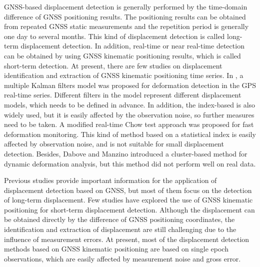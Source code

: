 \documentclass[final,3p,times]{elsarticle}
\begin{document}
	\textcolor{r_s}{
	GNSS-based displacement detection is generally performed by the time-domain difference of GNSS positioning results\cite{abidin2004use,rs12203375}. The positioning results can be obtained from repeated GNSS static measurements and the repetition period is generally one day to several months. This kind of displacement detection is called long-term displacement detection. In addition, real-time or near real-time detection can be obtained by using GNSS kinematic positioning results, which is called short-term detection.}
	At present, there are few studies on displacement identification and extraction of GNSS kinematic positioning time series. In \cite{li2010deformation}, a multiple Kalman filters model was proposed for deformation detection in the GPS real-time series. Different filters in the model represent different displacement models, which \textcolor{r_s}{needs} to be defined in advance. 
	In addition, the index-based is also widely used, but it is easily affected by the observation noise, so further measures need to be taken\cite{shen_shortterm2021}.
	A modified real-time Chow test approach was proposed for fast deformation monitoring\cite{bellone2016real}. This kind of method based on \textcolor{r_s}{a} statistical index is easily affected by observation noise, and is not suitable for small displacement detection\cite{pirotti2015micro}. Besides, Dabove and Manzino\cite{dabove2016fast} introduced a cluster-based method for dynamic deformation analysis, but this method did not perform well on real data.
	
	Previous studies provide important information for the application of displacement detection based on GNSS, but most of them focus on the detection of long-term displacement. 
	Few studies have explored the use of GNSS kinematic positioning for short-term displacement detection. 
	Although the displacement can be obtained directly by the difference of GNSS positioning coordinates, the identification and extraction of displacement are still challenging due to the influence of measurement errors.
	At present, most of the displacement detection methods based on GNSS kinematic positioning are based on single epoch observations, which are easily affected by measurement noise and gross error.
	
\end{document}
